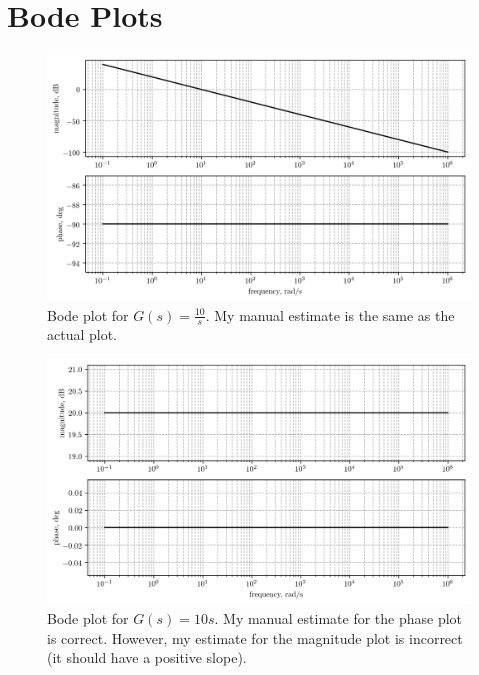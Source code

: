 \documentclass[12pt,a4paper]{article}
\begin{document}
\setcounter{page}{1}

\section*{Bode Plots}
\bigskip

\begin{figure}[!h]
	\centering
	\includegraphics[width=\linewidth]{0.png}
	\caption{Bode plot for $G(s) = \frac{10}{s}$. My manual estimate is the same as the actual plot.}
\end{figure}

\begin{figure}[!h]
	\centering
	\includegraphics[width=\linewidth]{1.png}
	\caption{Bode plot for $G(s) = 10s$. My manual estimate for the phase plot is correct. However, my estimate for the magnitude plot is incorrect (it should have a positive slope).}
\end{figure}
\end{document}
